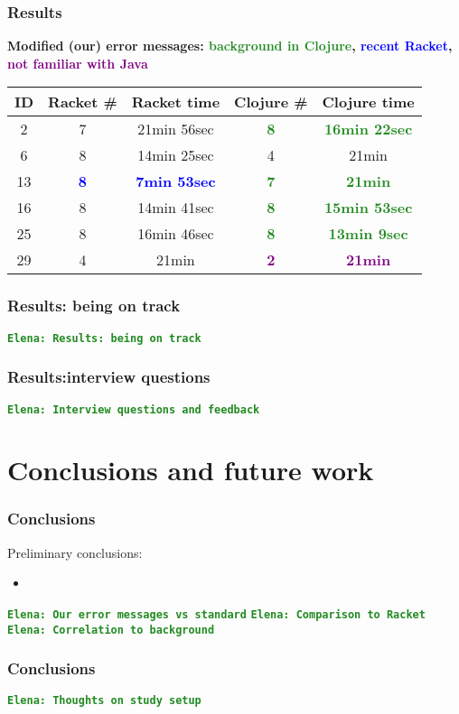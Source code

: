 \documentclass{beamer}
\newcommand{\comment}[1]{{\bf \tt  {#1}}}
\newcommand{\emcomment}[1]{\textcolor{ForestGreen}{\comment{Elena: {#1}}}}
\newcommand{\R}[1]{\textcolor{blue}{\bf {#1}}}
\newcommand{\Cl}[1]{\textcolor{ForestGreen}{\bf {#1}}}
\newcommand{\NoJava}[1]{\textcolor{purple}{\bf {#1}}}
\begin{document}
\begin{frame}
\frametitle{Results}
{\bf Modified (our) error messages:  \Cl{background in Clojure}, \R{recent Racket}, \NoJava{not familiar with Java}}
\vspace{0.1in}

\begin{tabular}{c | c| c| c | c }
\hline
{\bf ID} & {\bf Racket  \#} & {\bf Racket time} & {\bf Clojure  \#} & {\bf Clojure time} \\
\hline 
2 & 7  & 21min 56sec &  \Cl{8} & \Cl{16min 22sec} \\
6 &  8  & 14min 25sec &  4  &  21min \\
13 &  \R{8}  & \R{7min 53sec} &  \Cl{7}  &  \Cl{21min} \\
16 &  8  & 14min 41sec &  \Cl{8}  &  \Cl{15min 53sec} \\
25 &  8  & 16min 46sec &  \Cl{8}  &  \Cl{13min 9sec} \\
29 &  4  & 21min &  \NoJava{2}  & \NoJava{21min} \\
\hline
\end{tabular}
\end{frame}


\begin{frame}
\frametitle{Results: being on track}
\emcomment{Results: being on track}
\end{frame}

\begin{frame}
\frametitle{Results:interview questions}
\emcomment{Interview questions and feedback}
\end{frame}

\section{Conclusions and future work}

\frametitle{Conclusions}

\begin{frame}
Preliminary conclusions:
\begin{itemize}
\item 
\end{itemize}
\emcomment{Our error messages vs standard}
\emcomment{Comparison to Racket}
\emcomment{Correlation to background}
\end{frame}

\begin{frame}
\frametitle{Conclusions}
\emcomment{Thoughts on study setup}
\end{frame}
\end{document}
